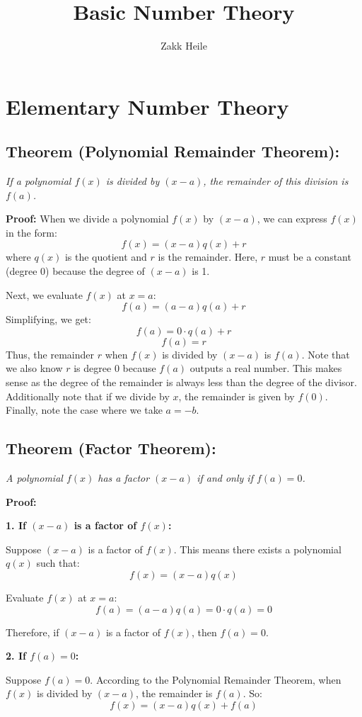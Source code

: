 \documentclass{article}
\title{Basic Number Theory}
\author{Zakk Heile}
\begin{document}
\section*{Elementary Number Theory}

\subsection*{Theorem (Polynomial Remainder Theorem):} \textit{If a polynomial \( f(x) \) is divided by \( (x - a) \), the remainder of this division is \( f(a) \).}

\textbf{Proof:}
When we divide a polynomial \( f(x) \) by \( (x - a) \), we can express \( f(x) \) in the form:
\[
f(x) = (x - a)q(x) + r
\]
where \( q(x) \) is the quotient and \( r \) is the remainder. Here, \( r \) must be a constant (degree \(0\)) because the degree of \( (x - a) \) is 1.

Next, we evaluate \( f(x) \) at \( x = a \):
\[
f(a) = (a - a)q(a) + r
\]
Simplifying, we get:
\[
f(a) = 0 \cdot q(a) + r
\]
\[
f(a) = r
\]
Thus, the remainder \( r \) when \( f(x) \) is divided by \( (x - a) \) is \( f(a) \).
Note that we also know \(r\) is degree $0$ because $f(a)$ outputs a real number. This makes sense as the degree of the remainder is always less than the degree of the divisor.
Additionally note that if we divide by \( x\), the remainder is given by \(f(0)\). Finally, note the case where we take \(a = -b\).


\subsection*{Theorem (Factor Theorem):}
\textit{A polynomial \( f(x) \) has a factor \( (x - a) \) if and only if \( f(a) = 0 \).}

\textbf{Proof:}

\textbf{1. If \( (x - a) \) is a factor of \( f(x) \):}

Suppose \( (x - a) \) is a factor of \( f(x) \). This means there exists a polynomial \( q(x) \) such that:
\[
f(x) = (x - a)q(x)
\]

Evaluate \( f(x) \) at \( x = a \):
\[
f(a) = (a - a)q(a) = 0 \cdot q(a) = 0
\]

Therefore, if \( (x - a) \) is a factor of \( f(x) \), then \( f(a) = 0 \).

\textbf{2. If \( f(a) = 0 \):}

Suppose \( f(a) = 0 \). According to the Polynomial Remainder Theorem, when \( f(x) \) is divided by \( (x - a) \), the remainder is \( f(a) \). So:
\[
f(x) = (x - a)q(x) + f(a)
\]
\end{document}
